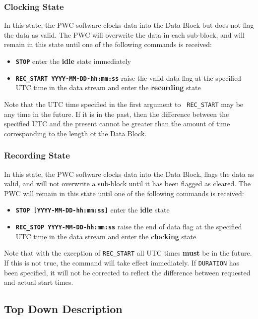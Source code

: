 \subsubsection{Clocking State}

In this state, the PWC software clocks data into the Data Block but
does not flag the data as valid.  The PWC will overwrite the data in
each sub-block, and will remain in this state until one of the
following commands is received:
\begin{itemize}
\item {\tt\bf STOP} enter the {\bf idle} state immediately
\item {\tt\bf REC\_START YYYY-MM-DD-hh:mm:ss} raise the valid data flag
	at the specified UTC time in the data stream and enter the {\bf
	recording} state
\end{itemize}
Note that the UTC time specified in the first argument to {\tt
REC\_START} may be any time in the future.  If it is in the past, then
the difference between the specified UTC and the present cannot be
greater than the amount of time corresponding to the length of the
Data Block.

\subsubsection{Recording State}

In this state, the PWC software clocks data into the Data Block, flags
the data as valid, and will not overwrite a sub-block until it has
been flagged as cleared.  The PWC will remain in this state until one
of the following commands is received:
\begin{itemize}
\item {\tt\bf STOP [YYYY-MM-DD-hh:mm:ss]} enter the {\bf idle} state
\item {\tt\bf REC\_STOP YYYY-MM-DD-hh:mm:ss} raise the end of data flag
	at the specified UTC time in the data stream and enter the {\bf
	clocking} state
\end{itemize}

Note that with the exception of {\tt REC\_START} all UTC times {\bf
must} be in the future.  If this is not true, the command will take
effect immediately.  If {\tt DURATION} has been specified, it will not
be corrected to reflect the difference between requested and actual
start times.

\subsection{Top Down Description}

